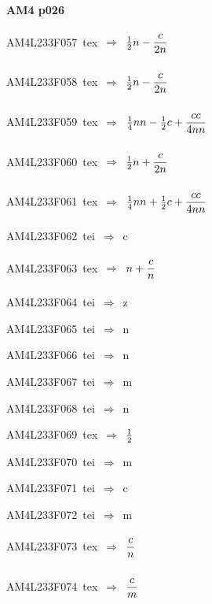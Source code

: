\par\vfill\eject
{\bf\hfill AM4 p026\hfill\hbox{}}\par\bigskip
{\sixrm AM4L233F057\ {\sixit tex}\ }$\Rightarrow$\ ${{1\over 2}}n - {{\displaystyle\strut c\over \displaystyle\strut 2n}}$\par\smallskip
{\sixrm AM4L233F058\ {\sixit tex}\ }$\Rightarrow$\ ${{1\over 2}}n - {{\displaystyle\strut c\over \displaystyle\strut 2n}}$\par\smallskip
{\sixrm AM4L233F059\ {\sixit tex}\ }$\Rightarrow$\ ${{1\over 4}}nn - {{1\over 2}}c + {{\displaystyle\strut cc\over \displaystyle\strut 4nn}}$\par\smallskip
{\sixrm AM4L233F060\ {\sixit tex}\ }$\Rightarrow$\ ${{1\over 2}}n + {{\displaystyle\strut c\over \displaystyle\strut 2n}}$\par\smallskip
{\sixrm AM4L233F061\ {\sixit tex}\ }$\Rightarrow$\ ${{1\over 4}}nn + {{1\over 2}}c + {{\displaystyle\strut cc\over \displaystyle\strut 4nn}}$\par\smallskip
{\sixrm AM4L233F062\ {\sixit tei}\ }$\Rightarrow$\ {\tenit c}\par\smallskip
{\sixrm AM4L233F063\ {\sixit tex}\ }$\Rightarrow$\ $n + {\displaystyle\strut c\over \displaystyle\strut n}$\par\smallskip
{\sixrm AM4L233F064\ {\sixit tei}\ }$\Rightarrow$\ {\tenit z}\par\smallskip
{\sixrm AM4L233F065\ {\sixit tei}\ }$\Rightarrow$\ {\tenit n}\par\smallskip
{\sixrm AM4L233F066\ {\sixit tei}\ }$\Rightarrow$\ {\tenit n}\par\smallskip
{\sixrm AM4L233F067\ {\sixit tei}\ }$\Rightarrow$\ {\tenit m}\par\smallskip
{\sixrm AM4L233F068\ {\sixit tei}\ }$\Rightarrow$\ {\tenit n}\par\smallskip
{\sixrm AM4L233F069\ {\sixit tex}\ }$\Rightarrow$\ ${1\over 2}$\par\smallskip
{\sixrm AM4L233F070\ {\sixit tei}\ }$\Rightarrow$\ {\tenit m}\par\smallskip
{\sixrm AM4L233F071\ {\sixit tei}\ }$\Rightarrow$\ {\tenit c}\par\smallskip
{\sixrm AM4L233F072\ {\sixit tei}\ }$\Rightarrow$\ {\tenit m}\par\smallskip
{\sixrm AM4L233F073\ {\sixit tex}\ }$\Rightarrow$\ ${\displaystyle\strut c\over \displaystyle\strut n}$\par\smallskip
{\sixrm AM4L233F074\ {\sixit tex}\ }$\Rightarrow$\ ${\displaystyle\strut c\over \displaystyle\strut m}$\par\smallskip
